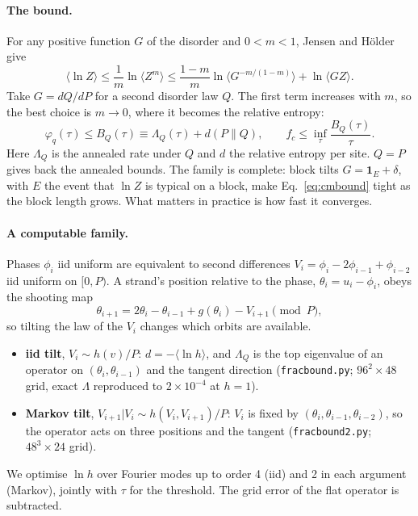 \documentclass[10pt,a4paper]{article}
\begin{document}
\paragraph{The bound.}
For any positive function $G$ of the disorder and $0<m<1$, Jensen and Hölder give
\[
\langle\ln Z\rangle\le\frac1m\ln\langle Z^m\rangle\le\frac{1-m}{m}\ln\big\langle G^{-m/(1-m)}\big\rangle+\ln\langle GZ\rangle .
\]
Take $G=dQ/dP$ for a second disorder law $Q$. The first term increases with $m$, so the best choice is $m\to0$, where it becomes the relative entropy:
\begin{equation}
\varphi_q(\tau)\le B_Q(\tau)\equiv\Lambda_Q(\tau)+d(P\|Q),\qquad f_c\le\inf_\tau\frac{B_Q(\tau)}{\tau}.
\label{eq:cmbound}
\end{equation}
Here $\Lambda_Q$ is the annealed rate under $Q$ and $d$ the relative entropy per site. $Q=P$ gives back the annealed bounds.
The family is complete: block tilts $G=\mathbf 1_E+\delta$, with $E$ the event that $\ln Z$ is typical on a block, make Eq.~\eqref{eq:cmbound} tight as the block length grows. What matters in practice is how fast it converges.

\paragraph{A computable family.}
Phases $\phi_i$ iid uniform are equivalent to second differences $V_i=\phi_i-2\phi_{i-1}+\phi_{i-2}$ iid uniform on $[0,P)$.
A strand's position relative to the phase, $\theta_i=u_i-\phi_i$, obeys the shooting map
\begin{equation}
\theta_{i+1}=2\theta_i-\theta_{i-1}+g(\theta_i)-V_{i+1}\pmod P ,
\end{equation}
so tilting the law of the $V_i$ changes which orbits are available.
\begin{itemize}
\item \textbf{iid tilt}, $V_i\sim h(v)/P$: $d=-\langle\ln h\rangle$, and $\Lambda_Q$ is the top eigenvalue of an operator on $(\theta_i,\theta_{i-1})$ and the tangent direction (\texttt{fracbound.py}; $96^2\times48$ grid, exact $\Lambda$ reproduced to $2\times10^{-4}$ at $h=1$).
\item \textbf{Markov tilt}, $V_{i+1}|V_i\sim h(V_i,V_{i+1})/P$: $V_i$ is fixed by $(\theta_i,\theta_{i-1},\theta_{i-2})$, so the operator acts on three positions and the tangent (\texttt{fracbound2.py}; $48^3\times24$ grid).
\end{itemize}
We optimise $\ln h$ over Fourier modes up to order 4 (iid) and 2 in each argument (Markov), jointly with $\tau$ for the threshold. The grid error of the flat operator is subtracted.
\end{document}
